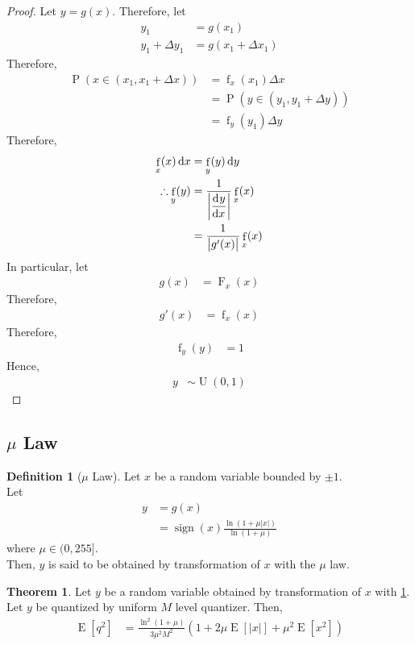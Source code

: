 \documentclass[titlepage, fleqn, a4paper, 12pt, twoside]{article}
\theoremstyle{definition}
\newtheorem{definition}{Definition}
\theoremstyle{theorem}
\newtheorem{theorem}{Theorem}
\DeclareMathOperator{\cdf}{\mathrm{F}}
\DeclareMathOperator{\pdf}{\mathrm{f}}
\DeclareMathOperator{\prob}{\mathrm{P}}
\DeclareMathOperator{\expct}{\mathrm{E}}
\DeclareMathOperator{\uniform}{\mathrm{U}}
\DeclareMathOperator{\sign}{\mathrm{sign}}
\begin{document}
\begin{proof}
	Let $y = g(x)$.
	Therefore, let
	\begin{align*}
		y_1 &= g(x_1)\\
		y_1 + \Delta y_1 &= g(x_1 + \Delta x_1)
	\end{align*}
	Therefore,
	\begin{align*}
		\prob\left( x \in (x_1, x_1 + \Delta x) \right) &= \pdf_x(x_1) \Delta x\\
		&= \prob\left( y \in (y_1, y_1 + \Delta y) \right)\\
		&= \pdf_y(y_1) \Delta y
	\end{align*}
	Therefore,
	\begin{align*}
		\pdf_x(x) \dif x &= \pdf_y(y) \dif y\\
		\therefore \pdf_y(y) &= \frac{1}{\left| \dod{y}{x} \right|} \pdf_x(x)\\
		&= \frac{1}{\left| g'(x) \right|} \pdf_x(x)
	\end{align*}
	In particular, let
	\begin{align*}
		g(x) &= \cdf_x(x)
	\end{align*}
	Therefore,
	\begin{align*}
		g'(x) &= \pdf_x(x)
	\end{align*}
	Therefore,
	\begin{align*}
		\pdf_y(y) &= 1
	\end{align*}
	Hence,
	\begin{align*}
		y &\sim \uniform(0,1)
	\end{align*}
\end{proof}

\subsection{$\mu$ Law}

\begin{definition}[$\mu$ Law]
	Let $x$ be a random variable bounded by $\pm 1$.\\
	Let
	\begin{align*}
		y &= g(x)\\
		&= \sign(x) \frac{\ln\left( 1 + \mu |x| \right)}{\ln(1 + \mu)}
	\end{align*}
	where $\mu \in (0,255]$.\\
	Then, $y$ is said to be obtained by transformation of $x$ with the $\mu$ law.
	\label{def:mu_law}
\end{definition}

\begin{theorem}
	Let $y$ be a random variable obtained by transformation of $x$ with \cref{def:mu_law}.\\
	Let $y$ be quantized by uniform $M$ level quantizer.
	Then,
	\begin{align*}
		\expct\left[ q^2 \right] &= \frac{\ln^2(1 + \mu)}{3 \mu^2 M^2} \left( 1 + 2 \mu \expct\left[ |x| \right] + \mu^2 \expct\left[ x^2 \right] \right)
	\end{align*}
\end{theorem}
\end{document}
